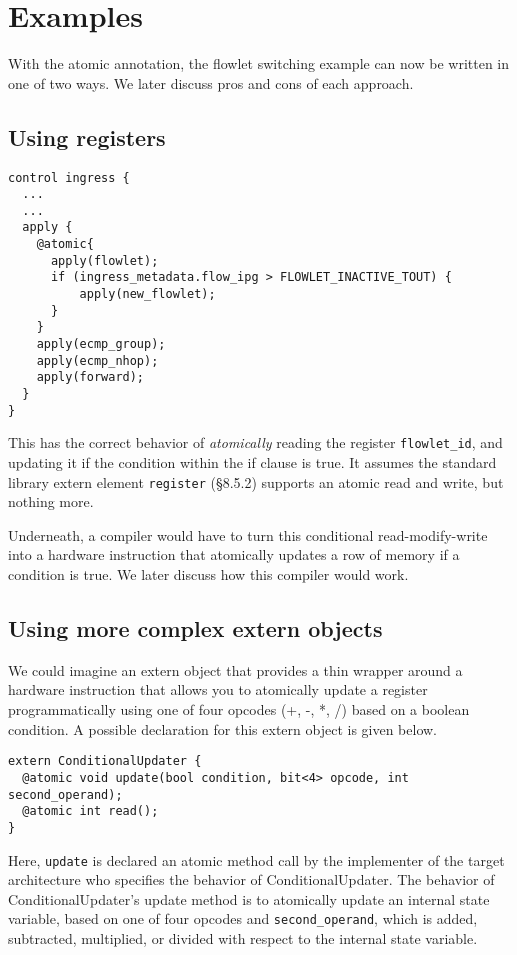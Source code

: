 \section{Examples}

With the atomic annotation, the flowlet switching example can now be written in
one of two ways. We later discuss pros and cons of each approach.

\subsection{Using registers}

\begin{verbatim}
control ingress {
  ...
  ...
  apply {
    @atomic{
      apply(flowlet);
      if (ingress_metadata.flow_ipg > FLOWLET_INACTIVE_TOUT) {
          apply(new_flowlet);
      }
    }
    apply(ecmp_group);
    apply(ecmp_nhop);
    apply(forward);
  }
}
\end{verbatim}

This has the correct behavior of \textit{atomically} reading the register
\texttt{flowlet\_id}, and updating it if the condition within the if clause is
true. It assumes the standard library extern element \texttt{register}
(\S8.5.2) supports an atomic read and write, but nothing more.

Underneath, a compiler would have to turn this conditional read-modify-write
into a hardware instruction that atomically updates a row of memory if a
condition is true. We later discuss how this compiler would work.

\subsection{Using more complex extern objects}

We could imagine an extern object that provides a thin wrapper around a
hardware instruction that allows you to atomically update a register
programmatically using one of four opcodes (+, -, *, /) based on a boolean
condition.  A possible declaration for this extern object is given below.

\begin{verbatim}
extern ConditionalUpdater {
  @atomic void update(bool condition, bit<4> opcode, int second_operand);
  @atomic int read();
}
\end{verbatim}

Here, \texttt{update} is declared an atomic method call by the implementer of
the target architecture who specifies the behavior of ConditionalUpdater.  The
behavior of ConditionalUpdater's update method is to atomically update an
internal state variable, based on one of four opcodes and
\texttt{second\_operand}, which is added, subtracted, multiplied, or divided
with respect to the internal state variable.

